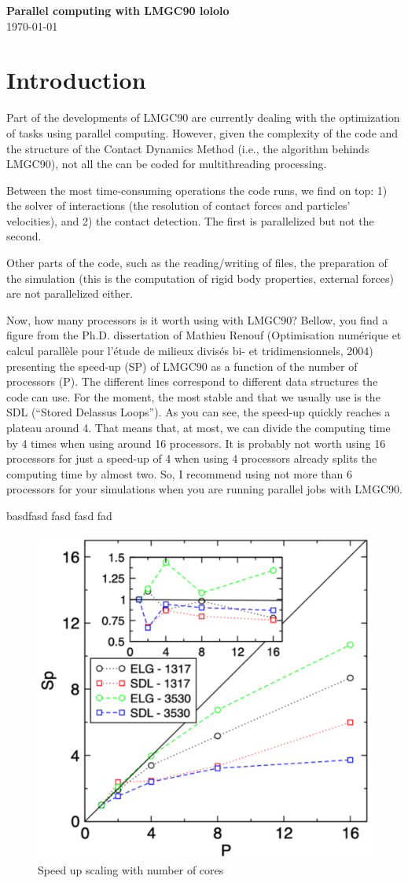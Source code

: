 \documentclass[12pt]{article}
\begin{document}
\thispagestyle{mypagestyle}

\begin{center}
  \textbf{\Large Parallel computing with LMGC90 lololo}\\
  \today
\end{center}

\section*{Introduction}
Part of the developments of LMGC90 are currently dealing with the optimization of tasks using parallel computing. However, given the complexity of the code and the structure of the Contact Dynamics Method (i.e., the algorithm behinds LMGC90), not all the can be coded for multithreading processing.

Between the most time-consuming operations the code runs, we find on top: 1) the solver of interactions (the resolution of contact forces and particles’ velocities), and 2) the contact detection. The first is parallelized but not the second.

Other parts of the code, such as the reading/writing of files, the preparation of the simulation (this is the computation of rigid body properties, external forces) are not parallelized either. 

Now, how many processors is it worth using with LMGC90? Bellow, you find a figure from the Ph.D. dissertation of Mathieu Renouf (Optimisation numérique et calcul parallèle pour l’étude de milieux divisés bi- et tridimensionnels, 2004) presenting the speed-up (SP) of LMGC90 as a function of the number of processors (P). 
The different lines correspond to different data structures the code can use. For the moment, the most stable and that we usually use is the SDL (“Stored Delassus Loops”). 
As you can see, the speed-up quickly reaches a plateau around 4. 
That means that, at most, we can divide the computing time by 4 times when using around 16 processors. It is probably not worth using 16 processors for just a speed-up of 4 when using 4 processors already splits the computing time by almost two. 
So, I recommend using not more than 6 processors for your simulations when you are running parallel jobs with LMGC90. 

basdfasd fasd fasd fad 

\begin{figure}
  \centering
  \includegraphics[width=0.5\linewidth]{figs/1_Scaling.pdf}
  \caption{Speed up scaling with number of cores}
\end{figure}
\end{document}
